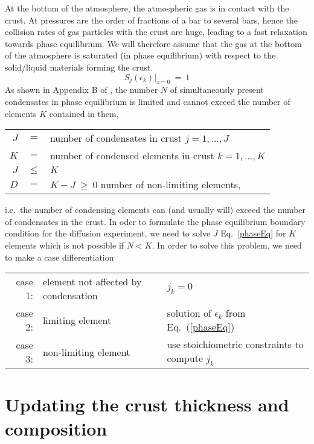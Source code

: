 \documentclass[11pt]{article}
\def\ek{\epsilon_k}
\begin{document}
At the bottom of the atmosphere, the atmospheric gas is in contact
with the crust. At pressures are the order of fractions of a bar to
several bars, hence the collision rates of gas particles with the crust are
huge, leading to a fast relaxation towards phase equilibrium.  We will
therefore assume that the gas at the bottom of the atmosphere is
saturated (in phase equilibrium) with respect to the solid/liquid 
materials forming the crust.
\begin{equation}
  S_j(\ek)\Big|_{z=0} ~=~ 1
  \label{phaseEq}
\end{equation}
As shown in Appendix B of \citep{Woitke2017}, the number $N$ of
simultaneously present condensates in phase equilibrium is limited
and cannot exceed the number of elements $K$ contained in them,\\
\begin{center}
\begin{tabular}{rcl}
  $J$ &$=$& number of condensates in crust $j=1,...,J$\\
  $K$ &$=$& number of condensed elements in crust $k=1,...,K$ \\
  $J$ &$\leq$ & $K$ \\
  $D$ &$=$& $K-J~\geq~0$ number of non-limiting elements,
\end{tabular}
\end{center} 
i.e.\ the number of condensing elements can (and usually will) 
exceed the number of condensates in the crust. In oder to formulate
the phase equilibrium boundary condition for the diffusion experiment,
we need to solve $J$ Eq.~\ref{phaseEq} for $K$ elements which is not
possible if $N<K$. In order to solve this problem, we need to make a 
case differentiation
\begin{center}
\begin{tabular}{rll}
  case 1: & element not affected by condensation & $j_k=0$\\
  case 2: & limiting element & solution of $\ek$ from
            Eq.~(\ref{phaseEq})\\
  case 3: & non-limiting element & use stoichiometric constraints
            to compute $j_k$
\end{tabular}
\end{center}




\section{Updating the crust thickness and composition}




\end{document}
